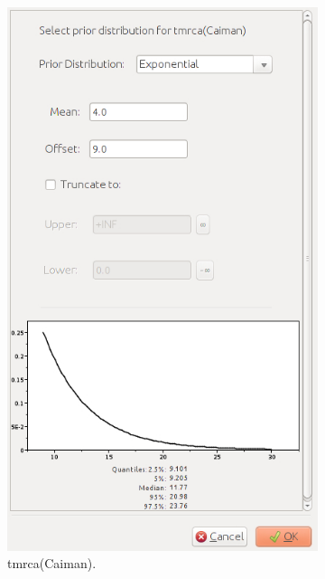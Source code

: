 {\begin{figure}[htbp]
\begin{subfigure}[b]{0.35\textwidth}
            \includegraphics[width=\textwidth]{../screenshots/beauti-prior-caiman.jpg}
            \caption{tmrca(Caiman).}
            \label{fig:beautiPriorsCaiman}
        \end{subfigure}
        \begin{subfigure}[b]{0.315\textwidth}

\end{subfigure}
\end{figure}}
